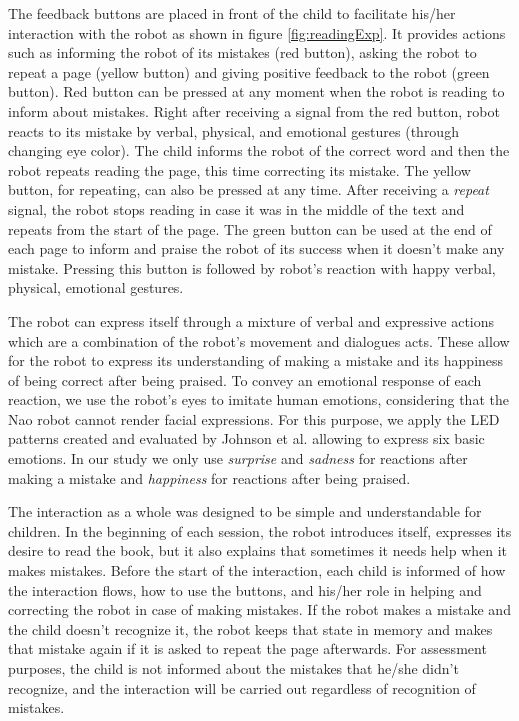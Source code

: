 \documentclass{sigchi}
\begin{document}
The feedback buttons are placed in front of the child to facilitate his/her interaction with the robot as shown in figure \ref{fig:readingExp}. 
It provides actions such as informing the robot of its mistakes (red button), asking the robot to repeat a page (yellow button) and giving positive feedback to the robot (green button). 
Red button can be pressed at any moment when the robot is reading to inform about mistakes. 
Right after receiving a signal from the red button, robot reacts to its mistake by verbal, physical, and emotional gestures (through changing eye color). 
The child informs the robot of the correct word and then the robot repeats reading the page, this time correcting its mistake. 
The yellow button, for repeating, can also be pressed at any time. 
After receiving a \emph{repeat} signal, the robot stops reading in case it was in the middle of the text and repeats from the start of the page. 
The green button can be used at the end of each page to inform and praise the robot of its success when it doesn't make any mistake. 
Pressing this button is followed by robot's reaction with happy verbal, physical, emotional gestures.


The robot can express itself through a mixture of verbal and expressive actions which are a combination of the robot's movement and dialogues acts. These allow for the robot to express its understanding of making a mistake and its happiness of being correct after being praised.
To convey an emotional response of each reaction, we use the robot's eyes to imitate human emotions, considering that the Nao robot cannot render facial expressions. 
For this purpose, we apply the LED patterns created and evaluated by Johnson et al. \cite{johnson2013imitating} allowing to express six basic emotions. In our study we only use \emph{surprise} and \emph{sadness} for reactions after making a mistake and \emph{happiness} for reactions after being praised.

The interaction as a whole was designed to be simple and understandable for children. 
In the beginning of each session, the robot introduces itself, expresses its desire to read the book, but it also explains that sometimes it needs help when it makes mistakes. 
Before the start of the interaction, each child is informed of how the interaction flows, how to use the buttons, and his/her role in helping and correcting the robot in case of making mistakes.
If the robot makes a mistake and the child doesn't recognize it, the robot keeps that state in memory and makes that mistake again if it is asked to repeat the page afterwards.
For assessment purposes, the child is not informed about the mistakes that he/she didn't recognize, and the interaction will be carried out regardless of recognition of mistakes.
\end{document}
